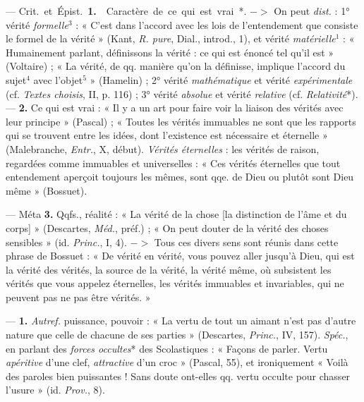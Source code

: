 \begin{itemize}[leftmargin=1cm, label=, itemsep=1pt]
 — \si{Crit.} et \si{Épist.} {\bf 1.}  Caractère de
ce qui est vrai*. $->$ On peut {\it dist.} : 1° vérité {\it formelle}$^3$ : «
C’est dans l’accord avec les lois de l’entendement que consiste le formel de
la vérité » (Kant, {\it R. pure}, Dial., introd., 1), et vérité {\it
matérielle}$^1$ : « Humainement parlant, définissons la vérité : ce qui est
énoncé tel qu'il est » (Voltaire) ; « La vérité, de qq. manière qu’on la
définisse, implique l'accord du sujet$^4$ avec l’objet$^5$ » (Hamelin) ; 2°
vérité {\it mathématique} et vérité {\it expérimentale} (cf. {\it Textes
choisis}, II, p. 116) ; 3° vérité {\it absolue} et vérité {\it relative} (cf.
{\it Relativité}*). —  {\bf 2.}  Ce qui est vrai : « Il y a un
art pour faire voir la liaison des vérités avec leur principe » (Pascal) ; «
Toutes les vérités immuables ne sont que les rapports qui se trouvent entre
les idées, dont l'existence est nécessaire et éternelle » (Malebranche,
{\it Entr.}, X, début). {\it Vérités éternelles} : les vérités de raison,
regardées comme immuables et universelles : « Ces vérités éternelles que tout
entendement aperçoit toujours les mêmes, sont qqe. de Dieu ou plutôt sont
Dieu même » (Bossuet).

— Méta  {\bf 3.} Qqfs., réalité : « La vérité de la chose [la distinction de
l’âme et du corps] » (Descartes, \si{{\it Méd.}}, préf.) ; « On peut douter
de la vérité des choses sensibles » (id. {\it Princ.}, I, 4). $->$ Tous ces
divers sens sont réunis dans cette phrase de Bossuet : « De vérité en vérité,
vous pouvez aller jusqu'à Dieu, qui est la vérité des vérités, la source de
la vérité, la vérité même, où subsistent les vérités que vous appelez
éternelles, les vérités immuables et invariables, qui ne peuvent pas ne pas
être vérités. »

 — {\bf 1.} {\it Autref.} puissance, pouvoir : « La vertu de tout
un aimant n’est pas d’autre nature que celle de chacune de ses parties
» (Descartes, {\it Princ.}, IV, 157). {\it Spéc.}, en parlant des {\it forces
occultes}* des Scolastiques : « Façons de parler. Vertu {\it apéritive} d'une
clef, {\it attractive} d'un croc » (Pascal, 55), et ironiquement « Voilà des
paroles bien puissantes !
Sans doute ont-elles qq. vertu occulte pour chasser l'usure » (id.
{\it Prov.}, 8).


\end{itemize}
